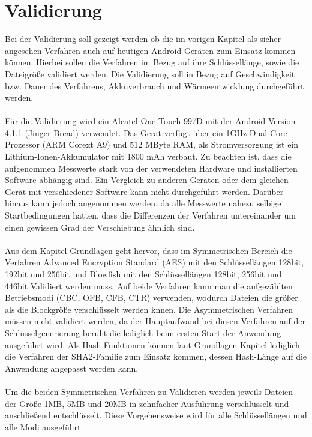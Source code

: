 \documentclass[10pt, a4paper]{scrreprt}
\begin{document}
\chapter{Validierung}
Bei der Validierung soll gezeigt werden ob die im vorigen Kapitel als sicher angesehen Verfahren auch auf heutigen Android-Geräten zum Einsatz kommen können. Hierbei sollen die Verfahren im Bezug auf ihre Schlüssellänge, sowie die Dateigröße validiert werden. Die Validierung soll in Bezug auf Geschwindigkeit bzw. Dauer des Verfahrens, Akkuverbrauch und Wärmeentwicklung durchgeführt werden.  \\ \\
Für die Validierung wird ein Alcatel One Touch 997D mit der Android Version 4.1.1 (Jinger Bread) verwendet. Das Gerät verfügt über ein 1GHz Dual Core Prozessor (ARM Corext A9) und 512 MByte RAM, als Stromversorgung ist ein Lithium-Ionen-Akkumulator mit 1800 mAh verbaut. Zu  beachten ist, dass die aufgenommen Messwerte stark von der verwendeten Hardware und installierten Software abhängig sind. Ein Vergleich zu anderen Geräten oder dem gleichen Gerät mit verschiedener Software kann nicht durchgeführt werden. Darüber hinaus kann jedoch angenommen werden, da alle Messwerte nahezu selbige Startbedingungen hatten, dass die Differenzen der Verfahren untereinander um einen gewissen Grad der Verschiebung ähnlich sind.\\ \\
Aus dem Kapitel Grundlagen geht hervor, dass im Symmetrischen Bereich die Verfahren Advanced Encryption Standard (AES) mit den Schlüssellängen 128bit, 192bit und 256bit und Blowfish mit den Schlüssellängen 128bit, 256bit und 446bit Validiert werden muss. Auf beide Verfahren kann man die aufgezählten Betriebsmodi (CBC, OFB, CFB, CTR) verwenden, wodurch Dateien die größer als die Blockgröße verschlüsselt werden knnen. Die Asymmetrischen Verfahren müssen nicht validiert werden, da der Hauptaufwand bei diesen Verfahren auf der Schlüsselgenerierung beruht die lediglich beim ersten Start der Anwendung ausgeführt wird. Als Hash-Funktionen können laut Grundlagen Kapitel lediglich die Verfahren der SHA2-Familie zum Einsatz kommen, dessen Hash-Länge auf die Anwendung angepasst werden kann. \\ \\
Um die beiden Symmetrischen Verfahren zu Validieren werden jeweils Dateien der Größe 1MB, 5MB und 20MB in zehnfacher Ausführung verschlüsselt und anschließend entschlüsselt. Diese Vorgehensweise wird für alle Schlüssellängen und alle Modi ausgeführt. \\
\end{document}
